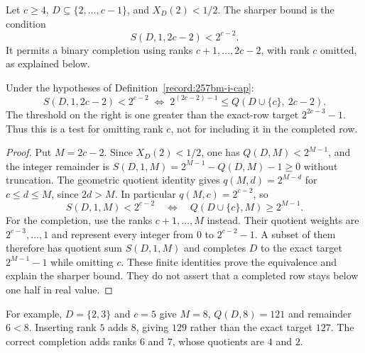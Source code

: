 \begin{defn}\label{record:257bm-i-cap}
Let $c\ge4$, $D\subseteq\{2,\ldots,c-1\}$, and $X_D(2)<1/2$.
The sharper bound is the condition
\[
 S(D,1,2c-2)<2^{c-2}.
\]
It permits a binary completion using ranks $c+1,\ldots,2c-2$,
with rank $c$ omitted, as explained below.
\par\noindent   {}
\end{defn}

\begin{thm}\label{record:257bm-i5}
Under the hypotheses of Definition~\ref{record:257bm-i-cap}:
\[
\ensuremath{S}(D,1,2c-2) < 2^{c-2} \;\Longleftrightarrow\; 2^{(2c-2)-1} \le \ensuremath{Q}(D\cup\{c\},\ 2c-2).
\]
The threshold on the right is one greater than the exact-row target
$2^{2c-3}-1$.  Thus this is a test for omitting rank $c$, not for
including it in the completed row.
\end{thm}

\begin{proof}
Put $M=2c-2$.  Since $X_D(2)<1/2$, one has
$Q(D,M)<2^{M-1}$, and the integer remainder is
$S(D,1,M)=2^{M-1}-Q(D,M)-1\ge0$ without truncation.
The geometric quotient identity gives
$q(M,d)=2^{M-d}$ for $c\le d\le M$, since $2d>M$.
In particular $q(M,c)=2^{c-2}$, so
\[
 S(D,1,M)<2^{c-2}
 \quad\Longleftrightarrow\quad
 Q(D\cup\{c\},M)\ge2^{M-1}.
\]
For the completion, use the ranks $c+1,\ldots,M$ instead.
Their quotient weights are $2^{c-3},\ldots,1$ and represent every
integer from $0$ to $2^{c-2}-1$.  A subset of them therefore has
quotient sum $S(D,1,M)$ and completes $D$ to the exact target
$2^{M-1}-1$ while omitting $c$.  These finite identities prove
the equivalence and explain the sharper bound.  They do not assert
that a completed row stays below one half in real value.
\end{proof}

For example, $D=\{2,3\}$ and $c=5$ give $M=8$, $Q(D,8)=121$
and remainder $6<8$.  Inserting rank $5$ adds $8$, giving $129$
rather than the exact target $127$.  The correct completion adds
ranks $6$ and $7$, whose quotients are $4$ and $2$.

